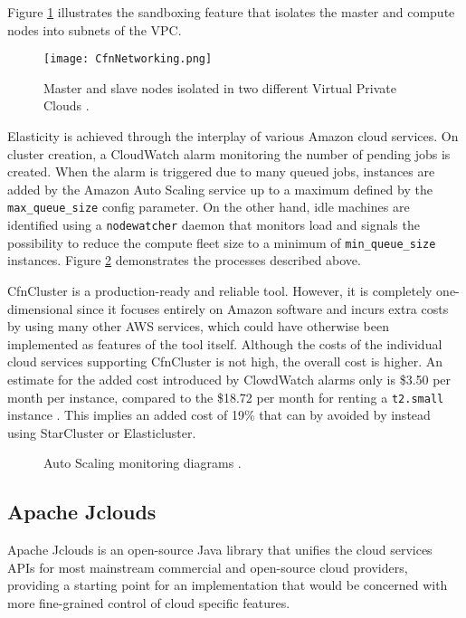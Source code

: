 Figure \ref{CfnNetworking} illustrates the sandboxing feature that isolates the master and compute nodes into subnets of the VPC.

\begin{figure}[H]
	\centering
		\texttt{[image: CfnNetworking.png]}
	\caption{Master and slave nodes isolated in two different Virtual Private Clouds \cite{CfnVPC}.}
	\label{CfnNetworking}
\end{figure}

Elasticity is achieved through the interplay of various Amazon cloud services. On cluster creation, a CloudWatch alarm monitoring the number of pending jobs is created. When the alarm is triggered due to many queued jobs, instances are added by the Amazon Auto Scaling service up to a maximum defined by the \verb|max_queue_size| config parameter. On the other hand, idle machines are identified using a \verb|nodewatcher| daemon that monitors load and signals the possibility to reduce the compute fleet size to a minimum of \verb|min_queue_size| instances. Figure \ref{CfnScaling} demonstrates the processes described above.

CfnCluster is a production-ready and reliable tool. However, it is completely one-dimensional since it focuses entirely on Amazon software and incurs extra costs by using many other AWS services, which could have otherwise been implemented as features of the tool itself. Although the costs of the individual cloud services supporting CfnCluster is not high, the overall cost is higher. An estimate for the added cost introduced by ClowdWatch alarms only is \$3.50 per month per instance, compared to the \$18.72 per month for renting a \verb|t2.small| instance \cite{AWSPricing}. This implies an added cost of 19\% that can by avoided by instead using StarCluster or Elasticluster.

\begin{figure}[H]
	\centering
	\caption{Auto Scaling monitoring diagrams \cite{CfnProcesses}.}
	\label{CfnScaling}
\end{figure}

\subsection{Apache Jclouds}

Apache Jclouds \cite{jclouds} is an open-source Java library that unifies the cloud services APIs for most mainstream commercial and open-source cloud providers, providing a starting point for an implementation that would be concerned with more fine-grained control of cloud specific features.

